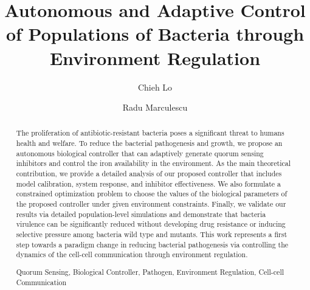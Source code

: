 \documentclass[runningheads]{llncs}
\newcommand{\keywords}[1]{\par\addvspace\baselineskip
\noindent\keywordname\enspace\ignorespaces#1}
\begin{document}
\mainmatter  %

\title{Autonomous and Adaptive Control of Populations of Bacteria through Environment Regulation}



\author{Chieh Lo \and Radu Marculescu}
%
\authorrunning{}


%
%

\maketitle


\begin{abstract}
The proliferation of antibiotic-resistant bacteria poses a significant threat to humans health and welfare. To reduce the bacterial pathogenesis and growth, we propose an autonomous biological controller that can adaptively generate quorum sensing inhibitors and control the iron availability in the environment. As the main theoretical contribution, we provide a detailed analysis of our proposed controller that includes model calibration, system response, and inhibitor effectiveness. We also formulate a constrained optimization problem to choose the values of the biological parameters of the proposed controller under given environment constraints. Finally, we validate our results via detailed population-level simulations and demonstrate that bacteria virulence can be significantly reduced without developing drug resistance or inducing selective pressure among bacteria wild type and mutants. This work represents a first step towards a paradigm change in reducing bacterial pathogenesis via controlling the dynamics of the cell-cell communication through environment regulation.\keywords{Quorum Sensing, Biological Controller, Pathogen, Environment Regulation, Cell-cell Communication}
\end{abstract}
\end{document}
